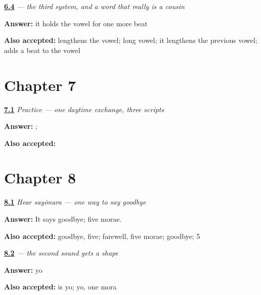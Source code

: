 \noindent\begin{minipage}[t]{\linewidth}
\raggedright
\hyperlink{review-JA-C01-koohii-bar}{\textbf{6.4}} \emph{ — the third system, and a word that really is a cousin}\par
\small \textbf{Answer:} it holds the vowel for one more beat\par
\footnotesize \textbf{Also accepted:} lengthens the vowel; long vowel; it lengthens the previous vowel; adds a beat to the vowel
\end{minipage}\par\medskip

\section*{Chapter 7}

\noindent\begin{minipage}[t]{\linewidth}
\raggedright
\hyperlink{review-JA-C01-practice-four-skills}{\textbf{7.1}} \emph{Practice — one daytime exchange, three scripts}\par
\small \textbf{Answer:} ; \par
\footnotesize \textbf{Also accepted:} 
\end{minipage}\par\medskip

\section*{Chapter 8}

\noindent\begin{minipage}[t]{\linewidth}
\raggedright
\hyperlink{review-JA-C08-hear-sayounara-meaning}{\textbf{8.1}} \emph{Hear \emph{sayōnara} — one way to say goodbye}\par
\small \textbf{Answer:} It says goodbye; five morae.\par
\footnotesize \textbf{Also accepted:} goodbye, five; farewell, five morae; goodbye; 5
\end{minipage}\par\medskip

\noindent\begin{minipage}[t]{\linewidth}
\raggedright
\hyperlink{review-JA-W08-yo-read}{\textbf{8.2}} \emph{ — the second sound gets a shape}\par
\small \textbf{Answer:} yo\par
\footnotesize \textbf{Also accepted:}  is yo; yo, one mora
\end{minipage}\par\medskip

